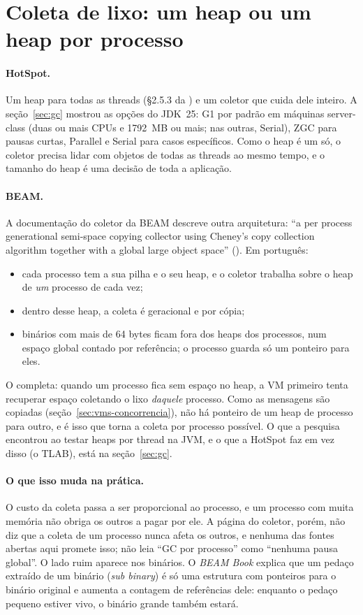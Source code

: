 \section{Coleta de lixo: um heap ou um heap por processo}
\label{sec:vms-gc}

\paragraph{HotSpot.}
Um heap para todas as threads (§2.5.3 da ) e um
coletor que cuida dele inteiro. A seção~\ref{sec:gc} mostrou as opções do
JDK~25: G1 por padrão em máquinas server-class (duas ou mais CPUs e
1792~MB ou mais; nas outras, Serial), ZGC para pausas curtas, Parallel e Serial para
casos específicos. Como o heap é um só, o coletor precisa lidar com objetos
de todas as threads ao mesmo tempo, e o tamanho do heap é uma decisão de
toda a aplicação.

\paragraph{BEAM.}
A documentação do coletor da BEAM descreve outra arquitetura:
\enquote{a per process generational semi-space copying collector using
Cheney's copy collection algorithm together with a global large object
space} (). Em português:
\begin{itemize}
\item cada processo tem a sua pilha e o seu heap, e o coletor trabalha
  sobre o heap de \emph{um} processo de cada vez;
\item dentro desse heap, a coleta é geracional e por cópia;
\item binários com mais de 64 bytes ficam fora dos heaps dos processos,
  num espaço global contado por referência; o processo guarda só um
  ponteiro para eles.
\end{itemize}
O  completa: quando um processo fica sem espaço
no heap, a VM primeiro tenta recuperar espaço coletando o lixo
\emph{daquele} processo. Como as mensagens são copiadas
(seção~\ref{sec:vms-concorrencia}), não há ponteiro de um heap de
processo para outro, e é isso que torna a coleta por processo possível.
O que a pesquisa encontrou ao testar heaps por thread na JVM, e o que a
HotSpot faz em vez disso (o TLAB), está na seção~\ref{sec:gc}.

\paragraph{O que isso muda na prática.}
O custo da coleta passa a ser proporcional ao processo, e um processo
com muita memória não obriga os outros a pagar por ele. A página do
coletor, porém, não diz que a coleta de um processo nunca afeta os
outros, e nenhuma das fontes abertas aqui promete isso; não leia
\enquote{GC por processo} como \enquote{nenhuma pausa global}. O lado
ruim aparece nos binários. O \emph{BEAM Book} explica que um pedaço
extraído de um binário (\emph{sub binary}) é só uma estrutura com
ponteiros para o binário original e aumenta a contagem de referências
dele: enquanto o pedaço pequeno estiver vivo, o binário grande também
estará.

